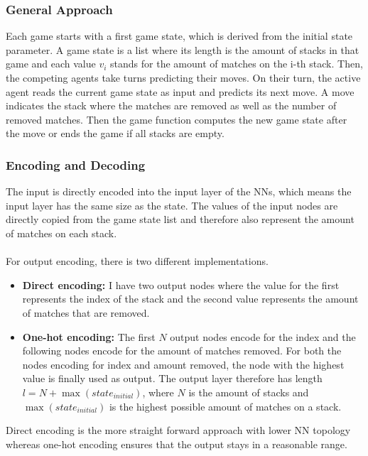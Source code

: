 \documentclass[11pt]{report}
\begin{document}
\begin{enumerate}
    \subsubsection{General Approach}
    Each game starts with a first game state, which is derived from the initial state parameter.
    A game state is a list where its length is the amount of stacks in that game and each value $v_i$ stands for the amount of matches on the i-th stack.
    Then, the competing agents take turns predicting their moves.
    On their turn, the active agent reads the current game state as input and predicts its next move.
    A move indicates the stack where the matches are removed as well as the number of removed matches.
    Then the game function computes the new game state after the move or ends the game if all stacks are empty.

    \subsubsection{Encoding and Decoding}
    The input is directly encoded into the input layer of the NNs, which means the input layer has the same size as the state.
    The values of the input nodes are directly copied from the game state list and therefore also represent the amount of matches on each stack.
    \\ \\
    For output encoding, there is two different implementations.
    \begin{itemize}
        \item \textbf{Direct encoding:} I have two output nodes where the value for the first represents the index of the stack and the second value represents the amount of matches that are removed.
        \item \textbf{One-hot encoding:} The first $N$ output nodes encode for the index and the following nodes encode for the amount of matches removed.
        For both the nodes encoding for index and amount removed, the node with the highest value is finally used as output.
        The output layer therefore has length $l = N + \max(state_{initial})$, where $N$ is the amount of stacks and $\max(state_{initial})$ is the highest possible amount of matches on a stack.
    \end{itemize}
    Direct encoding is the more straight forward approach with lower NN topology whereas one-hot encoding ensures that the output stays in a reasonable range.


\end{enumerate}
\end{document}
